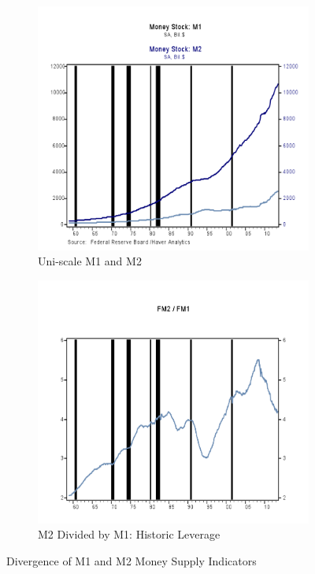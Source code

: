 \begin{figure}[H]
\centering
\begin{subfigure}{.5\textwidth}
  \centering
  \includegraphics[width=0.9\linewidth]{figure/MoneyStockDiv.png}
  \caption{Uni-scale M1 and M2}
  \label{fig:FM}
\end{subfigure}%
\begin{subfigure}{.5\textwidth}
  \centering
  \includegraphics[width=0.9\linewidth]{figure/HistoricalFM.png}
  \caption{M2 Divided by M1: Historic Leverage}
  \label{fig:multiple}
\end{subfigure}
\caption{Divergence of M1 and M2 Money Supply Indicators}
\label{fig:div}
\end{figure}


